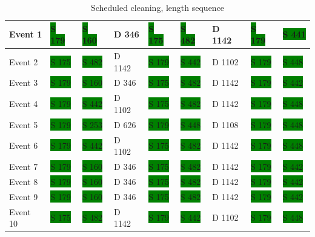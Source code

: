 \begin{table}[H]
\small
\centering
\caption{Scheduled cleaning, length sequence}
\label{tab:sclengthseq}
\begin{tabular}{|l|l|l|l|l|l|l|l|l|}
\hline
Event 1  & \colorbox{green}{S 179} & \colorbox{green}{S 160} & D 346  & \colorbox{green}{S 175} & \colorbox{green}{S 482} & D 1142 & \colorbox{green}{S 179} & \colorbox{green}{S 441} \\ \hline
Event 2  & \colorbox{green}{S 175} & \colorbox{green}{S 482} & D 1142 & \colorbox{green}{S 179} & \colorbox{green}{S 442} & D 1102 & \colorbox{green}{S 179} & \colorbox{green}{S 448}  \\ \hline
Event 3  & \colorbox{green}{S 179} & \colorbox{green}{S 160} & D 346  & \colorbox{green}{S 175} & \colorbox{green}{S 482} & D 1142 & \colorbox{green}{S 179} & \colorbox{green}{S 442}  \\ \hline
Event 4  & \colorbox{green}{S 179} & \colorbox{green}{S 442} & D 1102 & \colorbox{green}{S 175} & \colorbox{green}{S 482} & D 1142 & \colorbox{green}{S 179} & \colorbox{green}{S 448}  \\ \hline
Event 5  & \colorbox{green}{S 179} & \colorbox{green}{S 253} & D 626  & \colorbox{green}{S 179} & \colorbox{green}{S 448} & D 1108 & \colorbox{green}{S 179} & \colorbox{green}{S 448}  \\ \hline
Event 6  & \colorbox{green}{S 179} & \colorbox{green}{S 442} & D 1102 & \colorbox{green}{S 175} & \colorbox{green}{S 482} & D 1142 & \colorbox{green}{S 179} & \colorbox{green}{S 448}  \\ \hline
Event 7  & \colorbox{green}{S 179} & \colorbox{green}{S 160} & D 346  & \colorbox{green}{S 175} & \colorbox{green}{S 482} & D 1142 & \colorbox{green}{S 179} & \colorbox{green}{S 442}  \\ \hline
Event 8  & \colorbox{green}{S 179} & \colorbox{green}{S 160} & D 346  & \colorbox{green}{S 175} & \colorbox{green}{S 482} & D 1142 & \colorbox{green}{S 179} & \colorbox{green}{S 442}  \\ \hline
Event 9  & \colorbox{green}{S 179} & \colorbox{green}{S 160} & D 346  & \colorbox{green}{S 175} & \colorbox{green}{S 482} & D 1142 & \colorbox{green}{S 179} & \colorbox{green}{S 442}  \\ \hline
Event 10 & \colorbox{green}{S 175} & \colorbox{green}{S 482} & D 1142 & \colorbox{green}{S 179} & \colorbox{green}{S 442} & D 1102 & \colorbox{green}{S 179} & \colorbox{green}{S 448}  \\ \hline
\end{tabular}
\end{table}


